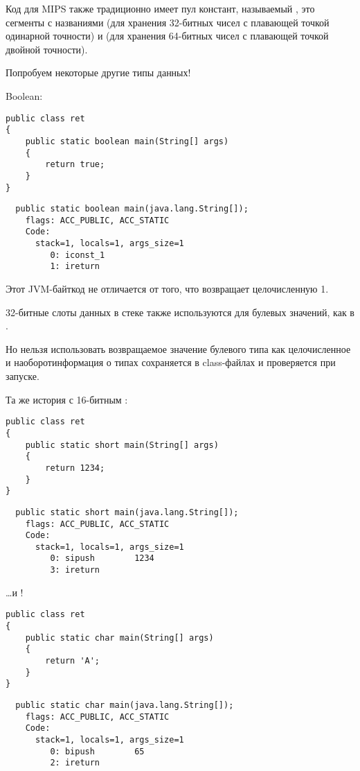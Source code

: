 Код для MIPS также традиционно имеет пул констант, называемый , это сегменты
с названиями  (для хранения 32-битных чисел с плавающей точкой одинарной точности) и
(для хранения 64-битных чисел с плавающей точкой двойной точности).

Попробуем некоторые другие типы данных!

Boolean:

\begin{lstlisting}
public class ret
{
	public static boolean main(String[] args) 
	{
		return true;
	}
}
\end{lstlisting}

\begin{lstlisting}
  public static boolean main(java.lang.String[]);
    flags: ACC_PUBLIC, ACC_STATIC
    Code:
      stack=1, locals=1, args_size=1
         0: iconst_1      
         1: ireturn       
\end{lstlisting}

Этот JVM-байткод не отличается от того, что возвращает целочисленную 1.

32-битные слоты данных в стеке также используются для булевых значений, как в \CCpp.

Но нельзя использовать возвращаемое значение булевого типа как целочисленное и наоборот\EMDASH{}информация 
о типах сохраняется в class-файлах и проверяется при запуске.

Та же история с 16-битным :

\begin{lstlisting}
public class ret
{
	public static short main(String[] args) 
	{
		return 1234;
	}
}
\end{lstlisting}

\begin{lstlisting}
  public static short main(java.lang.String[]);
    flags: ACC_PUBLIC, ACC_STATIC
    Code:
      stack=1, locals=1, args_size=1
         0: sipush        1234
         3: ireturn       
\end{lstlisting}

\dots и !

\begin{lstlisting}
public class ret
{
	public static char main(String[] args) 
	{
		return 'A';
	}
}
\end{lstlisting}

\begin{lstlisting}
  public static char main(java.lang.String[]);
    flags: ACC_PUBLIC, ACC_STATIC
    Code:
      stack=1, locals=1, args_size=1
         0: bipush        65
         2: ireturn       
\end{lstlisting}

